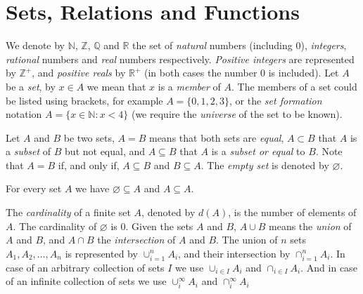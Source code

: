 %
%

\section{Sets, Relations and Functions}
\label{sec:sets}

We denote by $\mathbb{N}$, $\mathbb{Z}$, $\mathbb{Q}$ and $\mathbb{R}$ the set of \emph{natural} numbers (including $0$), \emph{integers}, \emph{rational} numbers and \emph{real} numbers respectively. \emph{Positive integers} are represented by $\mathbb{Z}^+$, and \emph{positive reals} by $\mathbb{R}^+$ (in both cases the number $0$ is included). Let $A$ be a \emph{set}, by $x\in A$ we mean that $x$ is a \emph{member} of $A$. The members of a set could be listed using brackets, for example $A = \{0, 1, 2, 3\}$, or the \emph{set formation} notation $A = \{x \in \mathbb{N} : x < 4\}$ (we require the \emph{universe} of the set to be known).

Let $A$ and $B$ be two sets, $A = B$ means that both sets are \emph{equal}, $A \subset B$ that $A$ is a \emph{subset} of $B$ but not equal, and $A \subseteq B$ that $A$ is a \emph{subset or equal} to $B$. Note that $A = B$ if, and only if, $A \subseteq B$ and $B \subseteq A$. The \emph{empty set} is denoted by $\varnothing$.

\begin{example}
For every set $A$ we have $\varnothing \subseteq A$ and $ A \subseteq A$.
\end{example}

The \emph{cardinality} of a finite set $A$, denoted by $d(A)$, is the number of elements of $A$. The cardinality of $\varnothing$ is 0. Given the sets $A$ and $B$, $A \cup B$ means the \emph{union} of $A$ and $B$, and $A \cap B$ the \emph{intersection} of $A$ and $B$. The union of $n$ sets $A_1, A_2, \ldots, A_n$ is represented by $\cup_{i=1}^n A_i$, and their intersection by $\cap_{i=1}^n A_i$. In case of an arbitrary collection of sets $I$ we use $\cup_{i \in I} A_i$ and $\cap_{i \in I} A_i$. And in case of an infinite collection of sets we use $\cup_{i}^{\infty} A_i$ and $\cap_{i}^{\infty} A_i$

